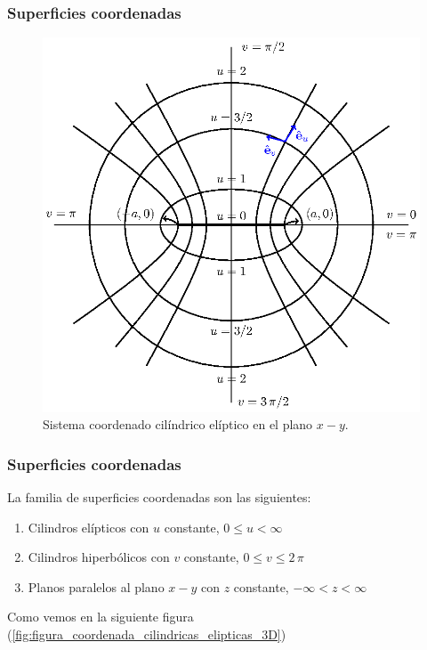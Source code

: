 \documentclass[12pt]{beamer}
\begin{document}
\begin{frame}
\frametitle{Superficies coordenadas}
\begin{figure}[H]
    \centering
    \includegraphics[scale=0.55]{Imagenes/Sistema_Cilindrico_Eliptico.eps}
    \caption{Sistema coordenado cilíndrico elíptico en el plano $x-y$.}
    \label{fig:figura_coordenada_cilindricas_elipticas}
\end{figure}
\end{frame}
\begin{frame}
\frametitle{Superficies coordenadas}
La familia de superficies coordenadas son las siguientes:
\pause
{}
\begin{enumerate}[<+->]
\item Cilindros elípticos con $u$ constante, $0 \leq u < \infty$
\item Cilindros hiperbólicos con $v$ constante, $0 \leq v \leq 2 \, \pi$
\item Planos paralelos al plano $x-y$ con $z$ constante, $-\infty < z < \infty$
\end{enumerate}
\pause
Como vemos en la siguiente figura (\ref{fig:figura_coordenada_cilindricas_elipticas_3D})
\end{frame}
\end{document}
